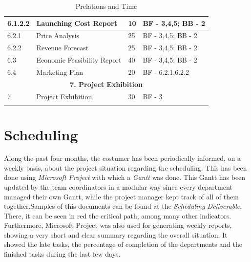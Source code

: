\begin{longtable}{ | p{1.3cm} | p{5cm} | p{3cm} | p{3.5cm} |}
6.1.2.2 & Launching Cost Report  & 10 & BF - 3,4,5; BB - 2 \\ \hline
6.2.1 & Price Analysis & 25 & BF - 3,4,5; BB - 2 \\ \hline
6.2.2 & Revenue Forecast & 25 & BF - 3,4,5; BB - 2 \\ \hline
6.3 & Economic Feasibility Report & 40 & BF - 3,4,5; BB - 2  \\ \hline
6.4 & Marketing Plan & 20 & BF - 6.2.1,6.2.2 \\ \hline
\multicolumn{4}{|c|}{\textbf{7. Project Exhibition}} \\ \hline
7 & Project Exhibition &30 & BF - 3 \\ \hline
\caption{Prelations and Time} \\
\end{longtable}

\section{Scheduling}
Along the past four months, the costumer has been periodically informed, on a weekly basis, about the project situation regarding the scheduling. This has been done using \textit{Microsoft Project} with which a \textit{Gantt} was done. This Gantt has been updated by the team coordinators in a modular way since every department managed their own Gantt, while the project manager kept track of all of them together.Samples of this documents can be found at the \textit{Scheduling Deliverable}. There, it can be seen in red the critical path, among many other indicators. Furthermore, Microsoft Project was also used for generating weekly reports, showing a very short and clear summary regarding the overall situation. It showed the late tasks, the percentage of completion of the departments and the finished tasks during the last few days.